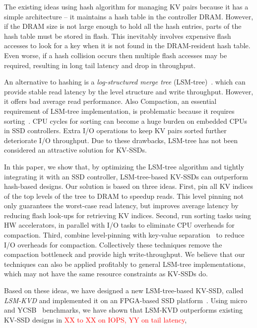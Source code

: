 \documentclass{abstract_hutech}
\newcommand{\ours}{LSM-KVD}
\begin{document}
The existing ideas using hash algorithm for managing KV pairs because it has a simple architecture -- it maintains a hash table in the controller DRAM.
However, if the DRAM size is not large enough to hold all the hash entries, parts of the hash table must be stored in flash.
This inevitably involves expensive flash accesses to look for a key when it is not found in the DRAM-resident hash table.  
Even worse, if a hash collision occurs then multiple flash accesses may be required, resulting in long tail latency and drop in throughput.

An alternative to hashing is a \emph{log-structured merge tree} (LSM-tree)~\cite{lsm-tree}. which can provide stable read latency by the level structure and write throughput.
However, it offers bad average read performance. Also Compaction, an essential requirement of LSM-tree implementation, is problematic because it requires sorting~\cite{wisckey,blsm,silk}.
CPU cycles for sorting can become a huge burden on embedded CPUs in SSD controllers. Extra I/O operations to keep KV pairs sorted further deteriorate I/O throughput.  
Due to these drawbacks, LSM-tree has not been considered an attractive solution for KV-SSDs.

In this paper, we show that, by optimizing the LSM-tree algorithm and tightly integrating it with an SSD controller, LSM-tree-based KV-SSDs can outperform hash-based designs.  
Our solution is based on three ideas.
First, pin all KV indices of the top levels of the tree to DRAM to speedup reads.
This level pinning not only guarantees the worst-case read latency, but improves average latency by reducing flash look-ups for retrieving KV indices.  
Second, run sorting tasks using HW accelerators, in parallel with I/O tasks to eliminate CPU overheads for compaction.
Third, combine level-pinning with key-value separation~\cite{wisckey} to reduce I/O overheads for compaction.
Collectively these techniques remove the compaction bottleneck and provide high write-throughput.
We believe that our techniques can also be applied profitably to general LSM-tree implementations, which may not have the same resource constraints as KV-SSDs do.

Based on these ideas, we have designed a new LSM-tree-based KV-SSD, called
\textit{\ours{}} and implemented it on an FPGA-based SSD
platform~\cite{bluedbm}. Using micro and YCSB~\cite{ycsb} benchmarks, we have
shown that \ours{} outperforms existing KV-SSD designs in \textcolor{red}{XX to XX on IOPS, YY on tail latency},
\end{document}
